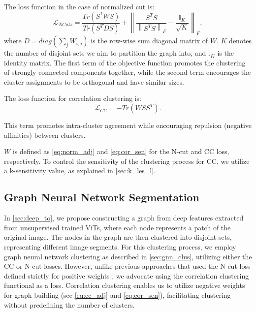\documentclass[10pt,twocolumn,letterpaper]{article}
\begin{document}
The loss function in the case of normalized cut is:
\begin{equation}
	\mathcal{L}_{NCuts} = \frac{Tr(S^TWS)}{Tr(S^TDS)} + \left\lVert \frac{S^TS}{\left\lVert  S^TS \right\rVert _F}  - \frac{\mathbb{I}_K}{\sqrt{K}}  \right\rVert_F,
  \label{eq:cut}
\end{equation}
where $D=diag(\sum_{j}W_{i,j})$ is the row-wise sum diagonal matrix of $W$. $K$ denotes the number of disjoint sets we aim to partition the graph into, and $\mathbb{I}_K$ is the identity matrix.
The first term of the objective function promotes the clustering of strongly connected components together, while the second term encourages the cluster assignments to be orthogonal and have similar sizes.

The loss function for correlation clustering \cite{bansal2004correlation} is:
\begin{equation}
	\mathcal{L}_{CC} = -Tr(WSS^T).
  \label{eq:cc}
\end{equation}

This term promotes intra-cluster agreement while encouraging repulsion (negative affinities) between clusters.

$W$ is defined as \cref{eq:norm_adj} and \cref{eq:cor_sen} for the N-cut and CC loss, respectively. To control the sensitivity of the clustering process for CC, we utilize a k-sensitivity value, as explained in \cref{sec:k_les_l}.


\subsection{Graph Neural Network Segmentation}

In \cref{sec:deep_to}, we propose constructing a graph from deep features extracted from unsupervised trained ViTs, where each node represents a patch of the original image. The nodes in the graph are then clustered into disjoint sets, representing different image segments. For this clustering process, we employ graph neural network clustering as described in \cref{sec:gnn_clus}, utilizing either the CC or N-cut losses. However, unlike previous approaches that used the N-cut loss defined strictly for positive weights \cite{bianchi2020spectral, melas2022deep}, we advocate using the correlation clustering functional as a loss. Correlation clustering enables us to utilize negative weights for graph building (see \cref{eq:cc_adj} and \cref{eq:cor_sen}), facilitating clustering without predefining the number of clusters.
\end{document}
